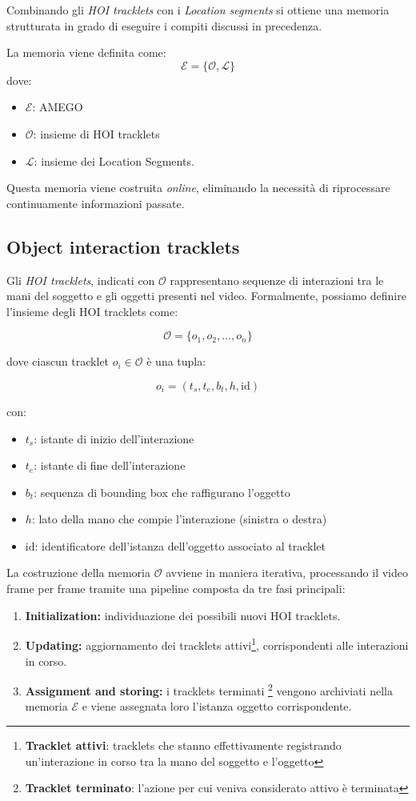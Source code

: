 Combinando gli \emph{HOI tracklets} con i \emph{Location segments} si ottiene una memoria strutturata in grado di eseguire i compiti discussi in precedenza.

La memoria viene definita come:
\[
\mathcal{E} = \{\mathcal{O}, \mathcal{L}\}
\]
dove:
\begin{itemize}
    \item $\mathcal{E}$: AMEGO
    \item $\mathcal{O}$: insieme di HOI tracklets
    \item $\mathcal{L}$: insieme dei Location Segments.
\end{itemize}

Questa memoria viene costruita \emph{online}, eliminando la necessità di riprocessare continuamente informazioni passate.

\subsection*{Object interaction tracklets}
Gli \emph{HOI tracklets}, indicati con $\mathcal{O}$ rappresentano sequenze di interazioni tra le mani del soggetto e gli oggetti presenti nel video. Formalmente, possiamo definire l'insieme degli HOI tracklets come:

\[
\mathcal{O} = \{ o_1, o_2, \dots, o_n \}
\]

dove ciascun tracklet $o_i \in \mathcal{O}$ è una tupla:

\[
o_i = (t_s, t_e, b_t, h, \text{id})
\]

con:
\begin{itemize}
    \item $t_s$: istante di inizio dell'interazione
    \item $t_e$: istante di fine dell'interazione
    \item $b_t$: sequenza di bounding box che raffigurano l'oggetto
    \item $h$: lato della mano che compie l'interazione (sinistra o destra)
    \item $\text{id}$: identificatore dell'istanza dell'oggetto associato al tracklet
\end{itemize}

La costruzione della memoria $\mathcal{O}$ avviene in maniera iterativa, processando il video frame per frame tramite una pipeline composta da tre fasi principali:

\begin{enumerate}
    \item \textbf{Initialization:} individuazione dei possibili nuovi HOI tracklets.
    \item \textbf{Updating:} aggiornamento dei tracklets attivi\footnote{\textbf{Tracklet attivi}: tracklets che stanno effettivamente registrando un'interazione in corso tra la mano del soggetto e l'oggetto}, corrispondenti alle interazioni in corso.
    \item \textbf{Assignment and storing:} i tracklets terminati \footnote{\textbf{Tracklet terminato}: l'azione per cui veniva considerato attivo è terminata} vengono archiviati nella memoria $\mathcal{E}$ e viene assegnata loro l'istanza oggetto corrispondente.
\end{enumerate}


